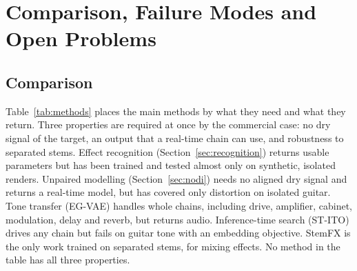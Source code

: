 \section{Comparison, Failure Modes and Open Problems}
\label{sec:comparison}

\subsection{Comparison}

Table~\ref{tab:methods} places the main methods by what they need and what
they return. Three properties are required at once by the commercial case:
no dry signal of the target, an output that a real-time chain can use, and
robustness to separated stems. Effect recognition (Section~\ref{sec:recognition})
returns usable parameters but has been trained and tested almost only on
synthetic, isolated renders. Unpaired modelling (Section~\ref{sec:nodi}) needs
no aligned dry signal and returns a real-time model, but has covered only
distortion on isolated guitar. Tone transfer (EG-VAE) handles whole chains,
including drive, amplifier, cabinet, modulation, delay and reverb, but returns
audio. Inference-time search (ST-ITO) drives any chain but fails on guitar
tone with an embedding objective. StemFX is the only work trained on separated
stems, for mixing effects. No method in the table has all three properties.

